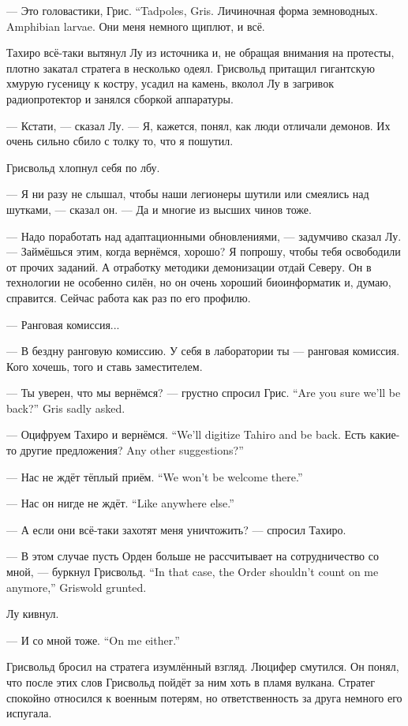 {--- Это головастики, Грис.}
{``Tadpoles, Gris.}
{Личиночная форма земноводных.}
{Amphibian larvae.}
Они меня немного щиплют, и всё.

Тахиро всё-таки вытянул Лу из источника и, не обращая внимания на протесты, плотно закатал стратега в несколько одеял.
Грисвольд притащил гигантскую хмурую гусеницу к костру, усадил на камень, вколол Лу в загривок радиопротектор и занялся сборкой аппаратуры.

--- Кстати, --- сказал Лу.
--- Я, кажется, понял, как люди отличали демонов.
Их очень сильно сбило с толку то, что я пошутил.

Грисвольд хлопнул себя по лбу.

--- Я ни разу не слышал, чтобы наши легионеры шутили или смеялись над шутками, --- сказал он.
--- Да и многие из высших чинов тоже.

--- Надо поработать над адаптационными обновлениями, --- задумчиво сказал Лу.
--- Займёшься этим, когда вернёмся, хорошо?
Я попрошу, чтобы тебя освободили от прочих заданий.
А отработку методики демонизации отдай Северу.
Он в технологии не особенно силён, но он очень хороший биоинформатик и, думаю, справится.
Сейчас работа как раз по его профилю.

--- Ранговая комиссия...

--- В бездну ранговую комиссию.
У себя в лаборатории ты --- ранговая комиссия.
Кого хочешь, того и ставь заместителем.

{--- Ты уверен, что мы вернёмся? --- грустно спросил Грис.}
{``Are you sure we'll be back?'' Gris sadly asked.}

{--- Оцифруем Тахиро и вернёмся.}
{``We'll digitize Tahiro and be back.}
{Есть какие-то другие предложения?}
{Any other suggestions?''}

{--- Нас не ждёт тёплый приём.}
{``We won't be welcome there.''}

{--- Нас он нигде не ждёт.}
{``Like anywhere else.''}

--- А если они всё-таки захотят меня уничтожить? --- спросил Тахиро.

{--- В этом случае пусть Орден больше не рассчитывает на сотрудничество со мной, --- буркнул Грисвольд.}
{``In that case, the Order shouldn't count on me anymore,'' Griswold grunted.}

Лу кивнул.

{--- И со мной тоже.}
{``On me either.''}

Грисвольд бросил на стратега изумлённый взгляд.
Люцифер смутился.
Он понял, что после этих слов Грисвольд пойдёт за ним хоть в пламя вулкана.
Стратег спокойно относился к военным потерям, но ответственность за друга немного его испугала.

